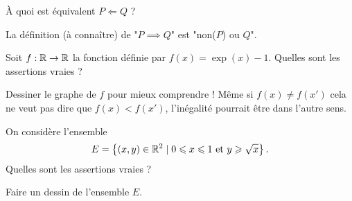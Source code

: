 \begin{question}
À quoi est équivalent $P \Longleftarrow Q$ ?
\begin{answers}  

      

\end{answers}
\begin{explanations}
La définition (à connaître) de "$P \implies Q$" est "non($P$) ou $Q$".
\end{explanations}
\end{question}


\begin{question}
Soit $f : \mathbb{R} \to \mathbb{R}$ la fonction définie par $f(x)=\exp(x)-1$.
Quelles sont les assertions vraies ?
\begin{answers}
\end{answers}
\begin{explanations}
Dessiner le graphe de $f$ pour mieux comprendre ! 
Même si $f(x) \neq f(x')$ cela ne veut pas dire que $f(x) < f(x')$, l'inégalité pourrait être dans l'autre sens.
\end{explanations}
\end{question}


\begin{question}
On considère l'ensemble 
$$E = \left\{ (x,y) \in \mathbb{R}^2 \mid 0 \leqslant x \leqslant 1 \text{ et } y \geqslant \sqrt{x}  \right\}.$$
Quelles sont les assertions vraies ?
\begin{answers}
    


\end{answers}
\begin{explanations}
Faire un dessin de l'ensemble $E$.
\end{explanations}
\end{question}


